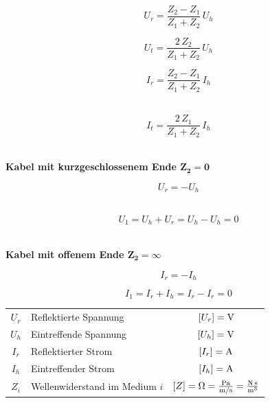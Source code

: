 \begin{minipage}{0.48\linewidth}
$$ \boxed{ U_r = \frac{Z_2 - Z_1}{Z_1 + Z_2} \, U_h } $$
\end{minipage}
\hfill
\begin{minipage}{0.48\linewidth}
$$ \boxed{ U_t = \frac{2 \, Z_2}{Z_1 + Z_2} \, U_h } $$
\end{minipage}


\begin{minipage}{0.48\linewidth}
$$ \boxed{ I_r = \frac{Z_2 - Z_1}{Z_1 + Z_2} \, I_h } $$ \\
\end{minipage}
\hfill
\begin{minipage}{0.48\linewidth}
$$ \boxed{ I_t = \frac{2 \, Z_1}{Z_1 + Z_2} \, I_h } $$ \\
\end{minipage}

\textbf{Kabel mit kurzgeschlossenem Ende $\boldsymbol{Z_2 = 0}$} \\
\vspace{0.2cm}
\begin{minipage}{0.3\linewidth}
$$ U_r = - U_h $$ \\
\end{minipage}
\hfill
\begin{minipage}{0.68\linewidth}
$$ U_1 = U_h + U_r  = U_h - U_h = 0 $$ \\
\end{minipage}


\textbf{Kabel mit offenem Ende $\boldsymbol{Z_2 = \infty}$} \\
\vspace{0.2cm}
\begin{minipage}{0.3\linewidth}
$$ I_r = - I_h $$ 
\end{minipage}
\hfill
\begin{minipage}{0.68\linewidth}
$$ I_1 = I_r + I_h  = I_r - I_r = 0 $$  
\end{minipage}

\vspace{0.2cm}

\renewcommand{\arraystretch}{1.1}
\begin{tabular}{clc}
$U_r$ & Reflektierte Spannung & $[U_r] = \mathrm{V}$ \\
$U_h$ & Eintreffende Spannung & $[U_h] = \mathrm{V}$ \\
$I_r$ & Reflektierter Strom & $[I_r] = \mathrm{A}$ \\
$I_h$ & Eintreffender Strom & $[I_h] = \mathrm{A}$ \\
$Z_i$ & Wellenwiderstand im Medium $i$ & $[Z] = \mathrm{\Omega} = \frac{\mathrm{Pa}}{\mathrm{m} / \mathrm{s}} = \frac{\mathrm{N} \, \mathrm{s}}{\mathrm{m}^3}$ \\
\end{tabular}
\renewcommand{\arraystretch}{1}




